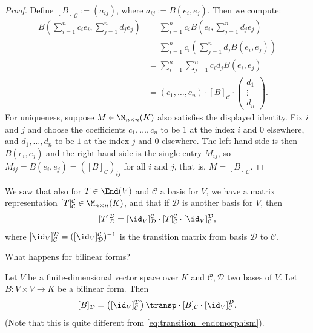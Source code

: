 \begin{proof}
Define $[B]_{\mathcal{C}} := (a_{ij})$, where $a_{ij} := B(e_i, e_j)$. Then we compute:
\begin{align*}
B\left(\sum_{i=1}^n c_i e_i, \sum_{j=1}^n d_j e_j\right) &= \sum_{i=1}^n c_i B\left(e_i, \sum_{j=1}^n d_j e_j\right) \\
&= \sum_{i=1}^n c_i \left(\sum_{j=1}^n d_j B(e_i, e_j)\right) \\
&= \sum_{i=1}^n \sum_{j=1}^n c_i d_j B(e_i, e_j) \\
&= (c_1, \dots, c_n) \cdot [B]_{\mathcal{C}} \cdot \begin{pmatrix} d_1 \\ \vdots \\ d_n \end{pmatrix}.
\end{align*}
For uniqueness, suppose $M \in \M_{n \times n}(K)$ also satisfies the displayed identity. Fix $i$ and $j$ and choose the coefficients $c_1, \dots, c_n$ to be $1$ at the index $i$ and $0$ elsewhere, and $d_1, \dots, d_n$ to be $1$ at the index $j$ and $0$ elsewhere. The left-hand side is then $B(e_i, e_j)$ and the right-hand side is the single entry $M_{ij}$, so $M_{ij} = B(e_i, e_j) = ([B]_{\mathcal{C}})_{ij}$ for all $i$ and $j$, that is, $M = [B]_{\mathcal{C}}$.
\end{proof}

We saw that also for $T \in \End(V)$ and $\mathcal{C}$ a basis for $V$, we have a matrix representation $[T]_{\mathcal{C}}^{\mathcal{C}} \in \M_{n \times n}(K)$, and that if $\mathcal{D}$ is another basis for $V$, then
\begin{equation}
\label{eq:transition_endomorphism}
[T]_{\mathcal{D}}^{\mathcal{D}} = [\id_V]_{\mathcal{D}}^{\mathcal{C}} \cdot [T]_{\mathcal{C}}^{\mathcal{C}} \cdot [\id_V]_{\mathcal{C}}^{\mathcal{D}},
\end{equation}
where $[\id_V]_{\mathcal{C}}^{\mathcal{D}} = ([\id_V]_{\mathcal{D}}^{\mathcal{C}})^{-1}$ is the transition matrix from basis $\mathcal{D}$ to $\mathcal{C}$.

\begin{question}
What happens for bilinear forms?
\end{question}

\begin{lemma}
\label{lem:change_of_basis_bilinear}
Let $V$ be a finite-di\-men\-sional vector space over $K$ and $\mathcal{C}, \mathcal{D}$ two bases of $V$. Let $B \colon V \times V \to K$ be a bilinear form. Then
\[
[B]_{\mathcal{D}} = \left([\id_V]_{\mathcal{C}}^{\mathcal{D}}\right)\transp \cdot [B]_{\mathcal{C}} \cdot [\id_V]_{\mathcal{C}}^{\mathcal{D}}.
\]
(Note that this is quite different from \eqref{eq:transition_endomorphism}).
\end{lemma}

